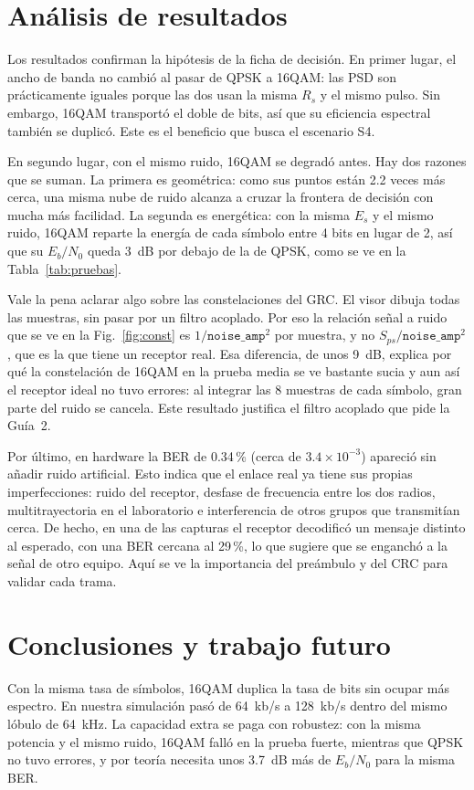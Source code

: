 \documentclass[10pt,twocolumn,letterpaper]{article}
\begin{document}
\section{Análisis de resultados}
Los resultados confirman la hipótesis de la ficha de decisión. En primer lugar, el ancho de banda no cambió al pasar de QPSK a 16QAM: las PSD son prácticamente iguales porque las dos usan la misma $R_s$ y el mismo pulso. Sin embargo, 16QAM transportó el doble de bits, así que su eficiencia espectral también se duplicó. Este es el beneficio que busca el escenario S4.

En segundo lugar, con el mismo ruido, 16QAM se degradó antes. Hay dos razones que se suman. La primera es geométrica: como sus puntos están 2.2 veces más cerca, una misma nube de ruido alcanza a cruzar la frontera de decisión con mucha más facilidad. La segunda es energética: con la misma $E_s$ y el mismo ruido, 16QAM reparte la energía de cada símbolo entre 4 bits en lugar de 2, así que su $E_b/N_0$ queda 3~dB por debajo de la de QPSK, como se ve en la Tabla~\ref{tab:pruebas}.

Vale la pena aclarar algo sobre las constelaciones del GRC. El visor dibuja todas las muestras, sin pasar por un filtro acoplado. Por eso la relación señal a ruido que se ve en la Fig.~\ref{fig:const} es $1/\texttt{noise\_amp}^2$ por muestra, y no $S_{ps}/\texttt{noise\_amp}^2$, que es la que tiene un receptor real. Esa diferencia, de unos 9~dB, explica por qué la constelación de 16QAM en la prueba media se ve bastante sucia y aun así el receptor ideal no tuvo errores: al integrar las 8 muestras de cada símbolo, gran parte del ruido se cancela. Este resultado justifica el filtro acoplado que pide la Guía~2.

Por último, en hardware la BER de 0.34\,\% (cerca de $3.4\times10^{-3}$) apareció sin añadir ruido artificial. Esto indica que el enlace real ya tiene sus propias imperfecciones: ruido del receptor, desfase de frecuencia entre los dos radios, multitrayectoria en el laboratorio e interferencia de otros grupos que transmitían cerca. De hecho, en una de las capturas el receptor decodificó un mensaje distinto al esperado, con una BER cercana al 29\,\%, lo que sugiere que se enganchó a la señal de otro equipo. Aquí se ve la importancia del preámbulo y del CRC para validar cada trama.

\section{Conclusiones y trabajo futuro}
Con la misma tasa de símbolos, 16QAM duplica la tasa de bits sin ocupar más espectro. En nuestra simulación pasó de 64~kb/s a 128~kb/s dentro del mismo lóbulo de 64~kHz. La capacidad extra se paga con robustez: con la misma potencia y el mismo ruido, 16QAM falló en la prueba fuerte, mientras que QPSK no tuvo errores, y por teoría necesita unos 3.7~dB más de $E_b/N_0$ para la misma BER.
\end{document}
